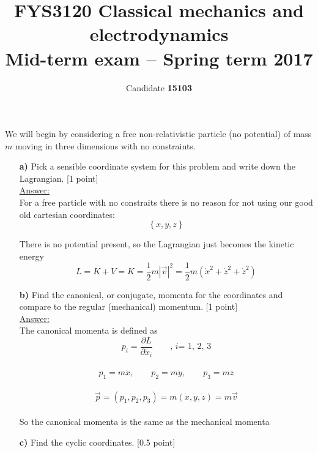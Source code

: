 \documentclass[11pt,a4paper]{report}
\title{FYS3120 Classical mechanics and electrodynamics\\
Mid-term exam -- Spring term 2017}
\author{Candidate {\bf 15103}}
\newcounter{excount}[chapter]
\newenvironment{exercise}[1][]{\addtocounter{excount}{1} \noindent {\bf Question
    \arabic{excount} \ \ #1}\hspace{2mm}}{\vspace{4mm}}
\begin{document}
\maketitle



\addtocounter{page}{1}


\begin{exercise}{\bf A (boring) Lagrangian\\}
We will begin by considering a free non-relativistic particle (no potential) of mass $m$ moving in three dimensions with no constraints.
\begin{itemize}
\item[\bf a)] Pick a sensible coordinate system for this problem and write down the Lagrangian. [1 point]\\



\underline{Answer:}\\
For a free particle with no constraits there is no reason for not using our good old cartesian coordinates:
\begin{equation}
\left\lbrace x, y, z \right\rbrace
\end{equation}

There is no potential present, so the Lagrangian just becomes the kinetic energy
\begin{equation}
L =K + V =  K = \frac{1}{2}m|\vec{v}|^2 = \frac{1}{2}m(\dot{x}^2 + \dot{z}^2 + \dot{z}^2)
\end{equation}


\item[\bf b)] Find the canonical, or conjugate, momenta for the coordinates and compare to the regular (mechanical) momentum. [1 point]\\



\underline{Answer:}\\
The canonical momenta is defined as
$$p_i  = \frac{\partial L}{\partial \dot{x}_i} \qquad \textit{, i= 1, 2, 3}$$
\\
$$p_1 = m\dot{x}, \qquad
p_2 = m\dot{y} , \qquad
p_3 = m\dot{z}$$
\\
$$\vec{p} = (p_1, p_2, p_3) = m(\dot{x}, \dot{y}, \dot{z}) = m\vec{v}$$
\\
So the canonical momenta is the same as the mechanical momenta\\


\item[\bf c)] Find the cyclic coordinates. [0.5 point]\\




\end{itemize}
\end{exercise}
\end{document}
